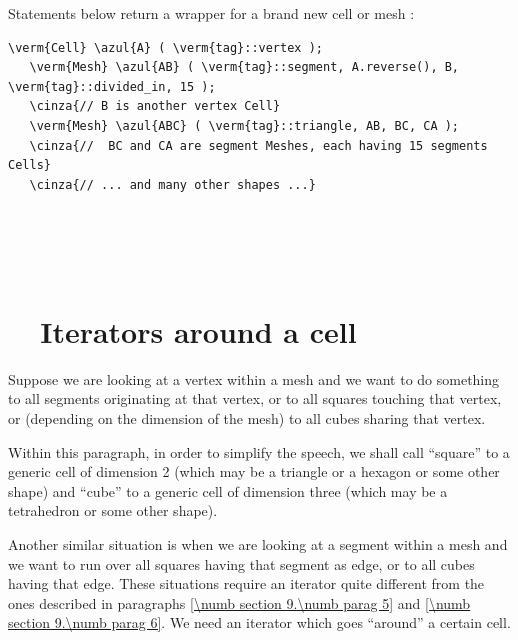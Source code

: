 Statements below return a wrapper for a brand new cell or mesh :

\begin{Verbatim}[commandchars=\\\{\},formatcom=\small\tt,
   baselinestretch=0.94,framesep=2mm                      ]
   \verm{Cell} \azul{A} ( \verm{tag}::vertex );
   \verm{Mesh} \azul{AB} ( \verm{tag}::segment, A.reverse(), B, \verm{tag}::divided_in, 15 );
   \cinza{// B is another vertex Cell}
   \verm{Mesh} \azul{ABC} ( \verm{tag}::triangle, AB, BC, CA );
   \cinza{//  BC and CA are segment Meshes, each having 15 segments Cells}
   \cinza{// ... and many other shapes ...}
\end{Verbatim}



\section{~~\cinza{[empty]}}\label{\numb section 9.\numb parag 11}


\section{~~Iterators around a cell}\label{\numb section 9.\numb parag 12}

Suppose we are looking at a vertex within a mesh and we want to do something to all segments
originating at that vertex, or to all squares touching that vertex, or (depending on the
dimension of the mesh) to all cubes sharing that vertex.

Within this paragraph, in order to simplify the speech, we shall call ``square'' to a generic
cell of dimension 2 (which may be a triangle or a hexagon or some other shape) and
``cube'' to a generic cell of dimension three (which may be a tetrahedron or some other shape).

Another similar situation is when we are looking at a segment within a mesh and we want to
run over all squares having that segment as edge, or to all cubes having that edge.
These situations require an iterator quite different from the ones described in paragraphs
\ref{\numb section 9.\numb parag 5} and \ref{\numb section 9.\numb parag 6}.
We need an iterator which goes ``around'' a certain cell.


